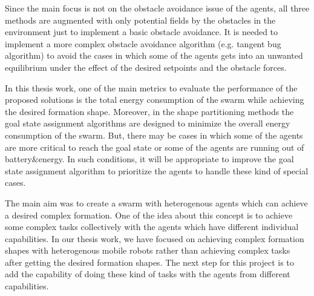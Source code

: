 Since the main focus is not on the obstacle avoidance issue of the agents, all three methods are augmented with only potential fields by the obstacles in the environment just to implement a basic obstacle avoidance. It is needed to implement a more complex obstacle avoidance algorithm (e.g. tangent bug algorithm) to avoid the cases in which some of the agents gets into an unwanted equilibrium under the effect of the desired setpoints and the obstacle forces.
    
In this thesis work, one of the main metrics to evaluate the performance of the proposed solutions is the total energy consumption of the swarm while achieving the desired formation shape. Moreover, in the shape partitioning methods the goal state assignment algorithms are designed to minimize the overall energy consumption of the swarm. But, there may be cases in which some of the agents are more critical to reach the goal state or some of the agents are running out of battery$\&$energy. In such conditions, it will be appropriate to improve the goal state assignment algorithm to prioritize the agents to handle these kind of special cases. 
    
The main aim was to create a swarm with heterogenous agents which can achieve a desired complex formation. One of the idea about this concept is to achieve some complex tasks collectively with the agents which have different individual capabilities. In our thesis work, we have focused on achieving complex formation shapes with heterogenous mobile robots rather than achieving complex tasks after getting the desired formation shapes. The next step for this project is to add the capability of doing these kind of tasks with the agents from different capabilities.
		
		
		
		
		
		
		
		
		
		
		
		
		
		
		
		
		